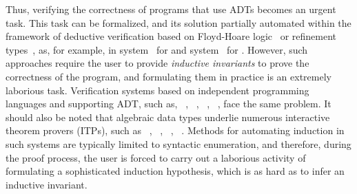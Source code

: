 Thus, verifying the correctness of programs that use ADTs becomes an urgent task.
This task can be formalized, and its solution partially automated within the framework of deductive verification based on Floyd-Hoare logic~\cite{Floyd1993,10.1145/363235.363259} or refinement types~\cite{713327}, as, for example, in \flux{} system~\cite{https://doi.org/10.48550/arxiv.2207.04034} for \rust{} and \leon{} system~\cite{10.1007/978-3-642-23702-7_23} for \scala{}.
However, such approaches require the user to provide \emph{inductive invariants} to prove the correctness of the program, and formulating them in practice is an extremely laborious task. Verification systems based on independent programming languages and supporting ADT, such as, \dafny{}~\cite{10.1007/978-3-642-17511-4_20}, \whyThree{}~\cite{10.1007/978-3-642-37036-6_8}, \viper{}~\cite{10.1007/978-3-662-49122-5_2}, \fstar{}~\cite{10.1145/2914770.2837655}, face the same problem.
It should also be noted that algebraic data types underlie numerous interactive theorem provers (ITPs), such as \coq{}~\cite{barras1999coq}, \idris{}~\cite{brady_2013}, \agda{}~\cite{10.1145/3341691}, \lean{}~\cite{10.1007/978-3-030-79876-5_37}.
Methods for automating induction in such systems are typically limited to syntactic enumeration, and therefore, during the proof process, the user is forced to carry out a laborious activity of formulating a sophisticated induction hypothesis, which is as hard as to infer an inductive invariant.

